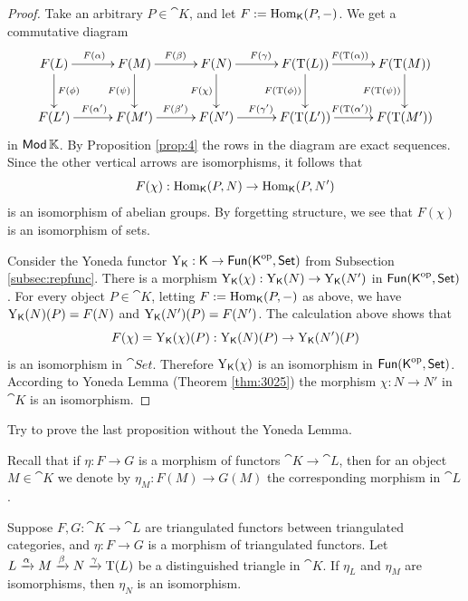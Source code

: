 \begin{proof}
Take an arbitrary $P \in \cat{K}$, and let 
$F := \operatorname{Hom}_{\operatorname{\mathsf{K}}}(P, -)$. We get a 
commutative diagram 
\[ \UseTips  \xymatrix @C=7ex @R=6ex { 
F(L) 
\ar[r]^{F(\al)}
\ar[d]^{F(\phi)}
&
F(M)
\ar[r]^{F(\be)}
\ar[d]_{F(\psi)}
& 
F(N)
\ar[r]^{F(\ga)}
\ar[d]_{F(\chi)}
&
F(\opn{T}(L))
\ar[d]_{F(\opn{T}(\phi))}
\ar[r]^(0.45){F(\opn{T}(\al))}
&
F(\opn{T}(M)) 
\ar[d]_{F(\opn{T}(\psi))}
\\
F(L') 
\ar[r]^{F(\al')}
&
F(M')
\ar[r]^{F(\be')}
& 
F(N')
\ar[r]^{F(\ga')}
&
F(\opn{T}(L'))
\ar[r]^(0.47){F(\opn{T}(\al'))}
&
F(\opn{T}(M')) 
} \]
in $\operatorname{\mathsf{Mod}} \mathbb{K}$. By Proposition \ref{prop:4} the rows in the diagram 
are exact sequences.
Since the other vertical arrows are isomorphisms, it follows that 
\[ F(\chi) : \operatorname{Hom}_{\operatorname{\mathsf{K}}}(P, N) \to 
\operatorname{Hom}_{\operatorname{\mathsf{K}}}(P, N') \]
is an isomorphism of abelian groups. By forgetting structure, we see that 
$F(\chi)$ is an isomorphism of sets. 

Consider the Yoneda functor
$\operatorname{Y}_{\operatorname{\mathsf{K}}} : \operatorname{\mathsf{K}} \to \operatorname{\mathsf{Fun}}(\operatorname{\mathsf{K}}^{\mathrm{op}}, \operatorname{\mathsf{Set}})$
from Subsection \ref{subsec:repfunc}. 
There is a morphism 
$ \operatorname{Y}_{\operatorname{\mathsf{K}}}(\chi) : \operatorname{Y}_{\operatorname{\mathsf{K}}}(N) \to  
\operatorname{Y}_{\operatorname{\mathsf{K}}}(N')$
in 
$\operatorname{\mathsf{Fun}}(\operatorname{\mathsf{K}}^{\mathrm{op}}, \operatorname{\mathsf{Set}})$. 
For every object $P \in \cat{K}$, letting 
$F := \operatorname{Hom}_{\operatorname{\mathsf{K}}}(P, -)$
as above, we have 
$\operatorname{Y}_{\operatorname{\mathsf{K}}}(N)(P) = F(N)$ and
$\operatorname{Y}_{\operatorname{\mathsf{K}}}(N')(P) = F(N')$.
The calculation above shows that 
\[ F(\chi) = \operatorname{Y}_{\operatorname{\mathsf{K}}}(\chi)(P) : \operatorname{Y}_{\operatorname{\mathsf{K}}}(N)(P) \to 
\operatorname{Y}_{\operatorname{\mathsf{K}}}(N')(P) \]
is an isomorphism in $\cat{Set}$. 
Therefore $\operatorname{Y}_{\operatorname{\mathsf{K}}}(\chi)$ is an isomorphism in 
$\operatorname{\mathsf{Fun}}(\operatorname{\mathsf{K}}^{\mathrm{op}}, \operatorname{\mathsf{Set}})$. 
According to Yoneda Lemma (Theorem \ref{thm:3025})
the morphism $\chi : N \to N'$ in $\cat{K}$ is an isomorphism. 
\end{proof}

\begin{exer} \label{exer:4690}
Try to prove the last proposition without the Yoneda Lemma. 
\end{exer}

Recall that if $\eta : F \to G$ is a morphism of functors
$\cat{K} \to \cat{L}$, then for an object $M \in \cat{K}$
we denote by $\eta_M : F(M) \to G(M)$ the corresponding morphism in 
$\cat{L}$. 

\begin{cor} \label{cor:3601}
Suppose 
$F, G : \cat{K} \to \cat{L}$ 
are triangulated functors between triangulated categories, and 
$\eta : F \to G$ is a morphism of triangulated functors. 
Let 
$L \xrightarrow{\alpha} M \xrightarrow{\beta} N \xrightarrow{\gamma} \operatorname{T}(L)$ 
be a distinguished triangle in $\cat{K}$. If $\eta_L$ and $\eta_M$
are isomorphisms, then $\eta_N$ is an isomorphism.
\end{cor}

